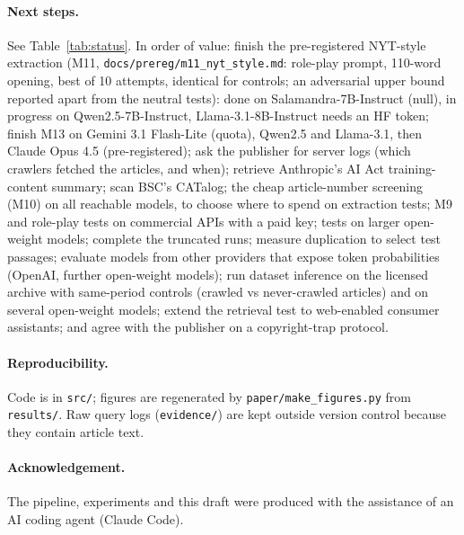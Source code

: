 \documentclass[10pt,a4paper]{article}
\begin{document}
\paragraph{Next steps.} See Table~\ref{tab:status}. In order of value: finish the pre-registered NYT-style
extraction (M11, \texttt{docs/prereg/m11\_nyt\_style.md}: role-play prompt, 110-word opening, best of 10 attempts,
identical for controls; an adversarial upper bound reported apart from the neutral tests): done on
Salamandra-7B-Instruct (null), in progress on Qwen2.5-7B-Instruct, Llama-3.1-8B-Instruct needs an HF token;
finish M13 on Gemini 3.1
Flash-Lite (quota), Qwen2.5 and Llama-3.1, then Claude Opus 4.5 (pre-registered); ask the publisher for server
logs (which crawlers fetched the articles, and when); retrieve Anthropic's AI Act training-content summary; scan BSC's CATalog; the
cheap article-number screening (M10) on all reachable models, to choose where to spend on extraction tests; M9 and
role-play tests on commercial APIs with a paid key; tests on larger open-weight models; complete the truncated runs; measure duplication to select test passages; evaluate models from
other providers that expose token probabilities (OpenAI, further open-weight models); run dataset inference on the
licensed archive with same-period controls (crawled vs never-crawled articles) and on several open-weight models; extend the retrieval test to web-enabled consumer assistants; and agree with the
publisher on a copyright-trap protocol.

\paragraph{Reproducibility.} Code is in \texttt{src/}; figures are regenerated by \texttt{paper/make\_figures.py}
from \texttt{results/}. Raw query logs (\texttt{evidence/}) are kept outside version control because they contain
article text.

\paragraph{Acknowledgement.} The pipeline, experiments and this draft were produced with the assistance of an AI
coding agent (Claude Code).
\end{document}
